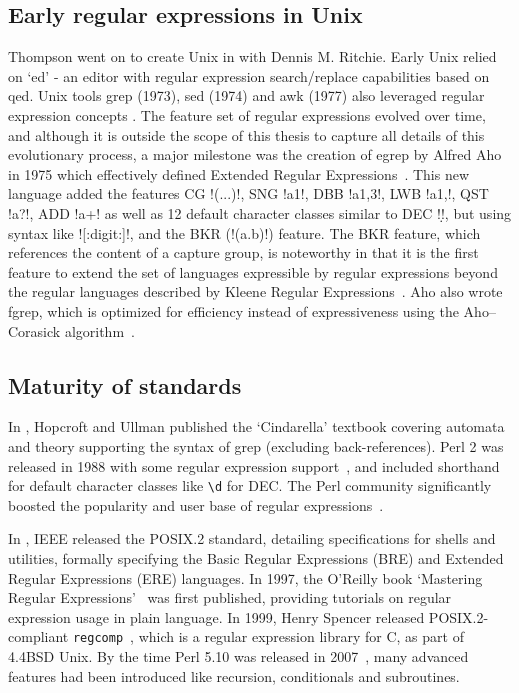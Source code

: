 \subsection{Early regular expressions in Unix}
Thompson went on to create Unix in \citeyear{Ritchie:1974:UTS:361011.361061} with Dennis M. Ritchie.  Early Unix relied on `ed' - an editor with regular expression search/replace capabilities based on qed.  Unix tools grep (1973), sed (1974) and awk (1977) also leveraged regular expression concepts \citep{UnixReader1987}.  The feature set of regular expressions evolved over time, and although it is outside the scope of this thesis to capture all details of this evolutionary process, a major milestone was the creation of egrep by Alfred Aho in 1975 which effectively defined Extended Regular Expressions~\citep{Hume:1988:TTG:55329.55333}.  This new language added the features CG \fverb!(...)!, SNG \fverb!a{1}!, DBB \fverb!a{1,3}!, LWB \fverb!a{1,}!, QST \fverb!a?!, ADD \fverb!a+! as well as 12 default character classes similar to DEC \fverb!\d!, but using syntax like \fverb![:digit:]!, and the BKR (\fverb!(a.b)\1!) feature.  The BKR feature, which references the content of a capture group, is noteworthy in that it is the first feature to extend the set of languages expressible by regular expressions beyond the regular languages described by Kleene Regular Expressions~\citep{Hopcroft:2006:IAT:1196416}. Aho also wrote fgrep, which is optimized for efficiency instead of expressiveness using the Aho–Corasick algorithm~\citep{Aho:1975:ESM:360825.360855}.

\subsection{Maturity of standards}
In \citeyear{HopcroftUllman1979}, Hopcroft and Ullman published the `Cindarella' textbook covering automata and theory supporting the syntax of grep (excluding back-references).  Perl 2 was released in 1988 with some regular expression support~\citep{perlhist}, and included shorthand for default character classes like \verb!\d! for DEC.  The Perl community significantly boosted the popularity and user base of regular expressions~\citep{perlTimeline}.

In \citeyear{IEEE1994POSIX2}, IEEE released the POSIX.2 standard, detailing specifications for shells and utilities, formally specifying the Basic Regular Expressions (BRE) and Extended Regular Expressions (ERE) languages.  In 1997, the O'Reilly book `Mastering Regular Expressions'~\citep{Friedl:2006:MRE:1209014} was first published, providing tutorials on regular expression usage in plain language.  In 1999, Henry Spencer released POSIX.2-compliant {\tt regcomp}~\citep{spencerTimeline}, which is a regular expression library for C, as part of 4.4BSD Unix.  By the time Perl 5.10 was released in 2007~\citep{perl5.10Release}, many advanced features had been introduced like recursion, conditionals and subroutines.
